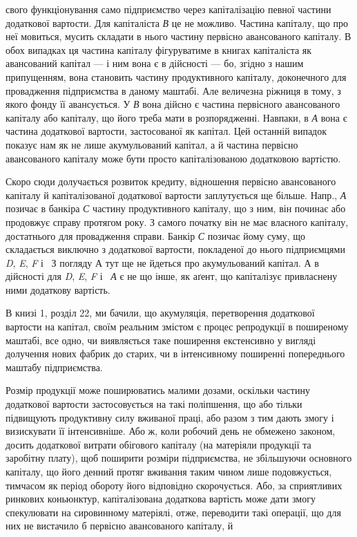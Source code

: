 \parcont{}  %
свого функціонування само підприємство через капіталізацію певної частини
додаткової вартости. Для капіталіста \emph{В} це не можливо. Частина
капіталу, що про неї мовиться, мусить складати в нього частину первісно
авансованого капіталу. В обох випадках ця частина капіталу фігуруватиме
в книгах капіталіста як авансований капітал — і ним вона є в
дійсності — бо, згідно з нашим припущенням, вона становить частину
продуктивного капіталу, доконечного для провадження підприємства
в даному маштабі. Але величезна ріжниця в тому, з якого фонду
її авансується. У \emph{В} вона дійсно є частина первісного авансованого
капіталу або капіталу, що його треба мати в розпорядженні.
Навпаки, в \emph{А} вона є частина додаткової вартости, застосованої як
капітал. Цей останній випадок показує нам як не лише акумульований
капітал, а й частина первісно авансованого капіталу може бути просто
капіталізованою додатковою вартістю.

Скоро сюди долучається розвиток кредиту, відношення первісно авансованого
капіталу й капіталізованої додаткової вартости заплутується
ще більше. Напр., \emph{А} позичає в банкіра \emph{С} частину продуктивного капіталу,
що з ним, він починає або продовжує справу протягом року. З
самого початку він не має власного капіталу, достатнього для провадження
справи. Банкір \emph{С} позичає йому суму, що складається виключно з
додаткової вартости, покладеної до нього підприємцями \emph{D}, \emph{E}, \emph{F} і~
З погляду А тут ще не йдеться про акумульований капітал. А в дійсності
для \emph{D}, \emph{E}, \emph{F} і~ \emph{А} є не що інше, як аґент, що капіталізує привласнену
ними додаткову вартість.

В книзі 1, розділ 22, ми бачили, що акумуляція, перетворення додаткової
вартости на капітал, своїм реальним змістом є процес репродукції
в поширеному маштабі, все одно, чи виявляється таке поширення
екстенсивно у вигляді долучення нових фабрик до старих, чи в інтенсивному
поширенні попереднього маштабу підприємства.

Розмір продукції може поширюватись малими дозами, оскільки
частину додаткової вартости застосовується на такі поліпшення, що або
тільки підвищують продуктивну силу вживаної праці, або разом з тим
дають змогу і визискувати її інтенсивніше. Або ж, коли робочий день не
обмежено законом, досить додаткової витрати обігового капіталу (на матеріяли
продукції та заробітну плату), щоб поширити розміри підприємства,
не збільшуючи основного капіталу, що його денний протяг вживання
таким чином лише подовжується, тимчасом як період обороту його
відповідно скорочується. Або, за сприятливих ринкових коньюнктур, капіталізована
додаткова вартість може дати змогу спекулювати на сировинному
матеріялі, отже, переводити такі операції, що для них не вистачило
б первісно авансованого капіталу, й~

